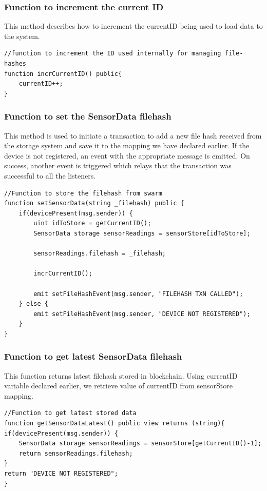 \documentclass[11pt,openright]{report}
\begin{document}
\subsubsection{Function to increment the current ID}
This method describes how to increment the currentID being used to load data to the system.
\begin{lstlisting}
//function to increment the ID used internally for managing file-hashes
function incrCurrentID() public{
    currentID++;
}
\end{lstlisting}

\subsubsection{Function to set the SensorData filehash}
This method is used to initiate a transaction to add a new file hash received from the storage system and save it to the mapping we have declared earlier. If the device is not registered, an event with the appropriate message is emitted. On success, another event is triggered which relays that the transaction was successful to all the listeners.

\begin{lstlisting}
//Function to store the filehash from swarm
function setSensorData(string _filehash) public {
    if(devicePresent(msg.sender)) {
        uint idToStore = getCurrentID();
        SensorData storage sensorReadings = sensorStore[idToStore];

        sensorReadings.filehash = _filehash;
   
        incrCurrentID();
        
        emit setFileHashEvent(msg.sender, "FILEHASH TXN CALLED");
    } else {
        emit setFileHashEvent(msg.sender, "DEVICE NOT REGISTERED");
    }
}
\end{lstlisting}

\subsubsection{Function to get latest SensorData filehash}
This function returns latest filehash stored in blockchain. Using currentID variable declared earlier, we retrieve value of currentID from sensorStore mapping.

\begin{lstlisting}
//Function to get latest stored data
function getSensorDataLatest() public view returns (string){
if(devicePresent(msg.sender)) {
    SensorData storage sensorReadings = sensorStore[getCurrentID()-1];
    return sensorReadings.filehash;
}
return "DEVICE NOT REGISTERED";
}
\end{lstlisting}
\end{document}
